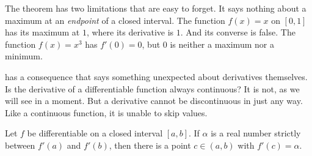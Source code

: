 \begin{marginfigure}
\centering
{}
\caption{At a peak, secants from the left slope upward and secants from the right slope downward.  The tangent is caught between them and must be horizontal.}
\end{marginfigure}

\begin{dangerousbend}
The theorem has two limitations that are easy to forget.  It says nothing about a maximum at an \emph{endpoint} of a closed interval.  The function $f(x) = x$ on $[0,1]$ has its maximum at $1$, where its derivative is $1$.  And its converse is false.  The function $f(x) = x^3$ has $f'(0) = 0$, but $0$ is neither a maximum nor a minimum.
\end{dangerousbend}

 has a consequence that says something unexpected about derivatives themselves.  Is the derivative of a differentiable function always continuous?  It is not, as we will see in a moment.  But a derivative cannot be discontinuous in just any way.  Like a continuous function, it is unable to skip values.

\begin{theorem}\label{thm:darboux}
Let $f$ be differentiable on a closed interval $[a,b]$.  If $\alpha$ is a real number strictly between $f'(a)$ and $f'(b)$, then there is a point $c \in (a,b)$ with $f'(c) = \alpha$.
\end{theorem}

